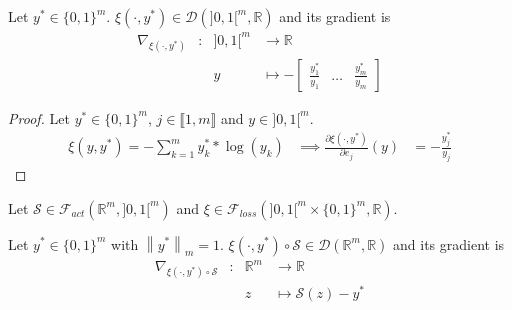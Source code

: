 \documentclass[11pt,en]{elegantpaper}
\newcommand{\norm}[1]{\left\lVert#1\right\rVert}
\newcommand{\Real}{\mathbb{R}}
\begin{document}
\begin{proposition}
  {\normalfont
    Let $y^* \in \{0,1\}^m$. $\xi(\cdot,y^*) \in \mathcal{D}(]0,1[^m, \Real)$ and its gradient is \begin{equation} \label{prop:cce_differential}
      \begin{array}{llll}
        \nabla_{\xi(\cdot,y^*)} & : & ]0,1[^m  & \longrightarrow \Real \\
        &   & y & \longmapsto - \begin{bmatrix}
          \frac{y^*_1}{y_1} & \ldots & \frac{y^*_m}{y_m}
        \end{bmatrix}
      \end{array}
    \end{equation}
  }
\end{proposition}

\begin{proof}
  Let $y^* \in \{0,1\}^m$, $j \in \llbracket 1,m \rrbracket$ and $y \in ]0,1[^m$. \begin{equation*}
    \begin{array}{lll}
      \xi(y,y^*) = - \sum_{k=1}^m y_k^* * \log(y_k) & \implies \frac{\partial \xi(\cdot,y^*)}{\partial e_j} (y) & = - \frac{y_j^*}{y_j}
    \end{array}
  \end{equation*}
\end{proof}

\begin{proposition}
  {\normalfont
    Let $\mathcal{S} \in \mathcal{F}_{act}(\Real^m,]0,1[^m)$ and $\xi \in \mathcal{F}_{loss}(]0,1[^m \times \{0,1\}^m, \Real)$. \par
    Let $y^* \in \{0,1\}^m$ with $\norm{y^*}_m = 1$.
    $\xi(\cdot,y^*) \circ \mathcal{S} \in \mathcal{D}(\Real^m,\Real)$ and its gradient is \begin{equation} \label{prop:cce_softmax_differential}
      \begin{array}{llll}
        \nabla_{\xi(\cdot,y^*) \circ \mathcal{S}} & : & \Real^m  & \longrightarrow \Real \\
        &   & z & \longmapsto \mathcal{S}(z) - y^*
      \end{array}
    \end{equation}
  }
\end{proposition}
\end{document}
